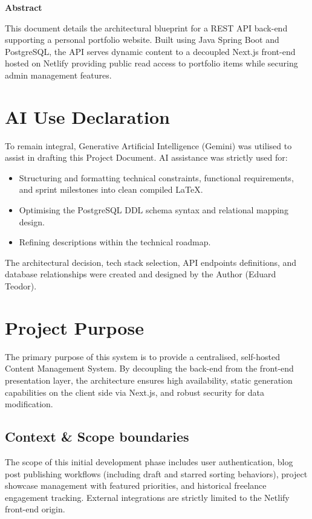 \documentclass[11pt,a4paper]{article}
\newenvironment{projectabstract}{
	\begin{center}
		{\bfseries\large Abstract}\vspace{-.5em}
	\end{center}
	\list{}{
		\setlength{\leftmargin}{1.0cm} 
		\setlength{\rightmargin}{1.0cm} 
	}
	\item\relax\itshape 
}{
	\endlist
	\vspace{1.5cm} 
}
\begin{document}
	
	\renewcommand{\contentsname}{Table of Contents}
	\tableofcontents
	
	\clearpage
	
	\begin{projectabstract}
		This document details the architectural blueprint for a REST API back-end supporting a personal portfolio website. Built using Java Spring Boot and PostgreSQL, the API serves dynamic content to a decoupled Next.js front-end hosted on Netlify providing public read access to portfolio items while securing admin management features.
	\end{projectabstract}
	
	\section*{AI Use Declaration}
	To remain integral, Generative Artificial Intelligence (Gemini) was utilised to assist in drafting this Project Document. AI assistance was strictly used for:
	\begin{itemize}
		\item Structuring and formatting technical constraints, functional requirements, and sprint milestones into clean compiled \LaTeX.
		\item Optimising the PostgreSQL DDL schema syntax and relational mapping design.
		\item Refining descriptions within the technical roadmap.
	\end{itemize}
	The architectural decision, tech stack selection, API endpoints definitions, and database relationships were created and designed by the Author (Eduard Teodor).
	
	\vspace{1cm}
	
	\section{Project Purpose}
	The primary purpose of this system is to provide a centralised, self-hosted Content Management System. By decoupling the back-end from the front-end presentation layer, the architecture ensures high availability, static generation capabilities on the client side via Next.js, and robust security for data modification.
	
	\subsection{Context \& Scope boundaries}
	The scope of this initial development phase includes user authentication, blog post publishing workflows (including draft and starred sorting behaviors), project showcase management with featured priorities, and historical freelance engagement tracking. External integrations are strictly limited to the Netlify front-end origin.
	
\end{document}
